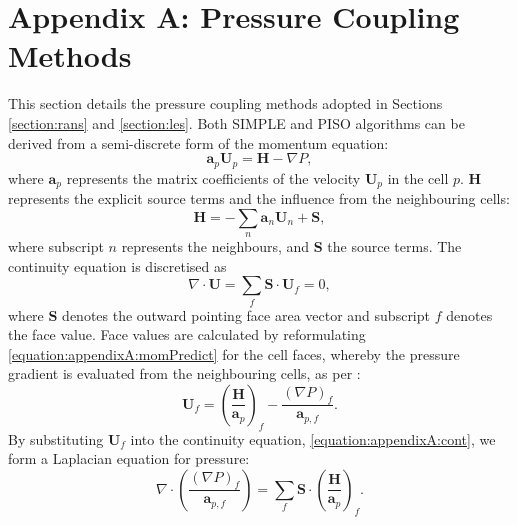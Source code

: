 \documentclass[12pt,oneside,a4paper]{article}
\newcommand{\vect}[1]{\boldsymbol{#1}}
\begin{document}
\newpage
{}


\newpage
\section*{Appendix A: Pressure Coupling Methods}
%
%
%
This section details the pressure coupling methods adopted in Sections \ref{section:rans} and \ref{section:les}. Both SIMPLE \citep{caretto1973} and PISO \citep{issa1986} algorithms can be derived from a semi-discrete form of the momentum equation:
\begin{equation}
\label{equation:appendixA:momPredict}
\vect{a}_p \vect{U}_p = \vect{H} - \nabla P,
\end{equation}
where $\vect{a}_p$ represents the matrix coefficients of the velocity $\vect{U}_p$ in the cell $p$. $\vect{H}$ represents the explicit source terms and the influence from the neighbouring cells:
\begin{equation}
\vect{H} = - \sum_n \vect{a}_n \vect{U}_n + \vect{S},
\end{equation}
where subscript $n$ represents the neighbours, and $\vect{S}$ the source terms. The continuity equation is discretised as
\begin{equation}
\label{equation:appendixA:cont}
\nabla \cdot \vect{U} = \sum_f \vect{S}\cdot \vect{U}_f = 0,
\end{equation}
where $\vect{S}$ denotes the outward pointing face area vector and subscript $f$ denotes the face value. Face values are calculated by reformulating \eqref{equation:appendixA:momPredict} for the cell faces, whereby the pressure gradient is evaluated from the neighbouring cells, as per \cite{rhie1983}:
\begin{equation}
\vect{U}_f = \left( \frac{\vect{H}}{\vect{a}_p} \right)_f - \frac{\left( \nabla P \right)_f}{\vect{a}_{p,f}}.
\end{equation}
By substituting $\vect{U}_f$ into the continuity equation, \eqref{equation:appendixA:cont}, we form a Laplacian equation for pressure: 
\begin{equation}
\label{equation:appendixA:pressure}
\nabla \cdot \left( \frac{\left(\nabla P\right)_f}{\vect{a}_{p,f}} \right) = \sum_f \vect{S} \cdot \left(  \frac{\vect{H}}{\vect{a}_p}  \right)_f.
\end{equation}
\end{document}
